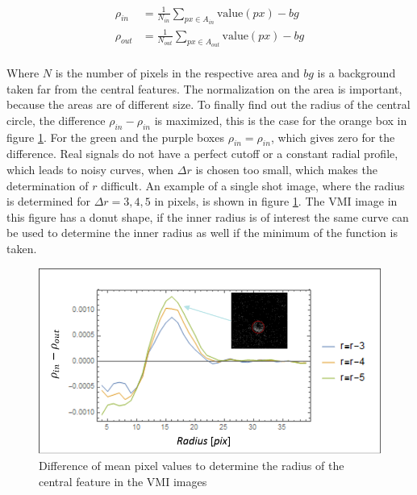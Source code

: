 \begin{align}
\rho_{in} & = \frac{1}{N_{in}} \sum_{px \in A_{in}} \text{value}(px) - bg \\
\rho_{out} & = \frac{1}{N_{out}} \sum_{px \in A_{out}} \text{value} (px) -bg \\
\end{align}

Where $N$ is the number of pixels in the respective area and $bg$ is a background taken far from the central features. The normalization on the area is important, because the areas are of different size. To finally find out the radius of the central circle, the difference $\rho_{in}-\rho_{in}$ is maximized, this is the case for the orange box in figure \ref{fig:density_plot}. For the green and the purple boxes $\rho_{in} = \rho_{in}$, which gives zero for the difference.
Real signals do not have a perfect cutoff or a constant radial profile, which leads to noisy curves, when $\Delta r$ is chosen too small, which makes the determination of $r$ difficult. An example of a single shot image, where the radius is determined for $\Delta r = 3,4,5$ in pixels, is shown in figure \ref{fig:density_plot}. The VMI image in this figure has a donut shape, if the inner radius is of interest the same curve can be used to determine the inner radius as well if the minimum of the function is taken.
\begin{figure}

\centering
\includegraphics[width=10 cm]{../images/density_plot.png}
\caption{Difference of mean pixel values to determine the radius of the central feature in the VMI images}
\label{fig:density_plot}
\end{figure}

